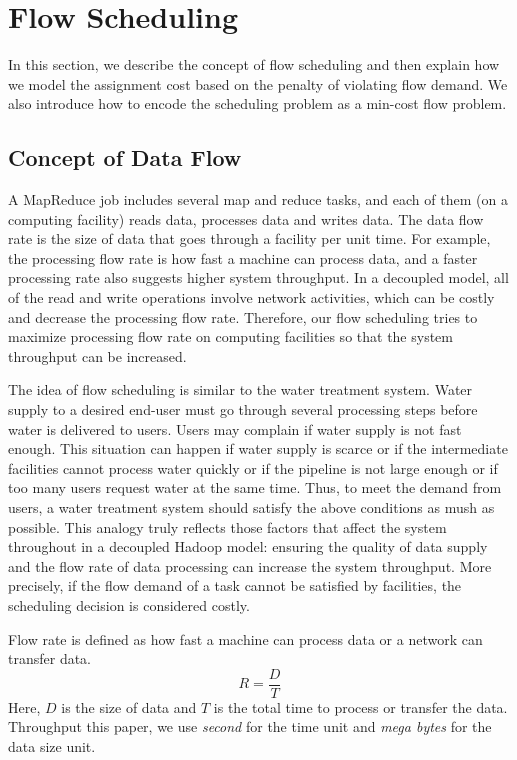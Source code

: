 \section{Flow Scheduling}
In this section, we describe the concept of flow scheduling and then explain how we model the assignment cost based on the penalty of violating flow demand.
We also introduce how to encode the scheduling problem as a min-cost flow problem.

\label{sec:flow_scheduling}

\subsection{Concept of Data Flow}
\label{sec:flow_rate}

A MapReduce job includes several map and reduce tasks, and each of them (on a computing facility) reads data, processes data and writes data.
The data flow rate is the size of data that goes through a facility per unit time.
For example, the processing flow rate is how fast a machine can process data, and a faster processing rate also suggests higher system throughput.
In a decoupled model, all of the read and write operations involve network activities, which can be costly and decrease the processing flow rate.
Therefore, our flow scheduling tries to maximize processing flow rate on computing facilities so that the system throughput can be increased.

The idea of flow scheduling is similar to the water treatment system.
Water supply to a desired end-user must go through several processing steps before water is delivered to users.
Users may complain if water supply is not fast enough.
This situation can happen if water supply is scarce or if the intermediate facilities cannot process water quickly or if the pipeline is not large enough or if too many users request water at the same time.
Thus, to meet the demand from users, a water treatment system should satisfy the above conditions as mush as possible.
This analogy truly reflects those factors that affect the system throughout in a decoupled Hadoop model: ensuring the quality of data supply and the flow rate of data processing can increase the system throughput.
More precisely, if the flow demand of a task cannot be satisfied by facilities, the scheduling decision is considered costly.

Flow rate is defined as how fast a machine can process data  or a network can transfer data.  
\begin{equation*} \label{eq:flow_rate}
R=\frac{D}{T}
\end{equation*}
Here, $D$ is the size of data and $T$ is the total time to process or transfer the data.
Throughput this paper, we use \textit{second} for the time unit and \textit{mega bytes} for the data size unit.


